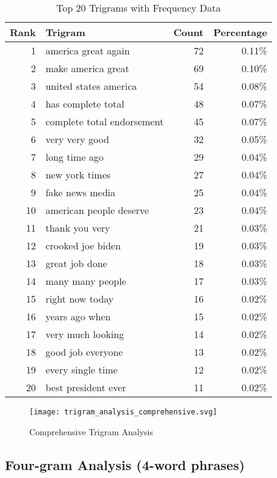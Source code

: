 \documentclass[12pt,a4paper]{article}
\begin{document}
\begin{table}[H]
\centering
\caption{Top 20 Trigrams with Frequency Data}
\begin{tabular}{@{}rlrr@{}}
\toprule
\textbf{Rank} & \textbf{Trigram} & \textbf{Count} & \textbf{Percentage} \\
\midrule
1 & america great again & 72 & 0.11\% \\
2 & make america great & 69 & 0.10\% \\
3 & united states america & 54 & 0.08\% \\
4 & has complete total & 48 & 0.07\% \\
5 & complete total endorsement & 45 & 0.07\% \\
6 & very very good & 32 & 0.05\% \\
7 & long time ago & 29 & 0.04\% \\
8 & new york times & 27 & 0.04\% \\
9 & fake news media & 25 & 0.04\% \\
10 & american people deserve & 23 & 0.04\% \\
11 & thank you very & 21 & 0.03\% \\
12 & crooked joe biden & 19 & 0.03\% \\
13 & great job done & 18 & 0.03\% \\
14 & many many people & 17 & 0.03\% \\
15 & right now today & 16 & 0.02\% \\
16 & years ago when & 15 & 0.02\% \\
17 & very much looking & 14 & 0.02\% \\
18 & good job everyone & 13 & 0.02\% \\
19 & every single time & 12 & 0.02\% \\
20 & best president ever & 11 & 0.02\% \\
\bottomrule
\end{tabular}
\end{table}

\begin{figure}[H]
\centering
\texttt{[image: trigram\_analysis\_comprehensive.svg]}
\caption{Comprehensive Trigram Analysis}
\label{fig:trigram_analysis}
\end{figure}

\subsection{Four-gram Analysis (4-word phrases)}
\end{document}
